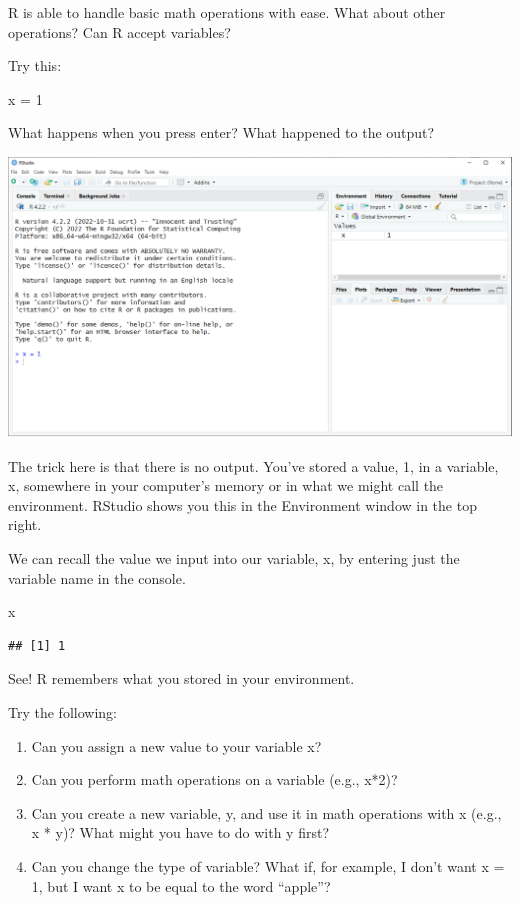 \documentclass[
]{book}
\newenvironment{Shaded}{\begin{snugshade}}{\end{snugshade}}
\newcommand{\DecValTok}[1]{\textcolor[rgb]{0.00,0.00,0.81}{#1}}
\newcommand{\NormalTok}[1]{#1}
\newcommand{\OtherTok}[1]{\textcolor[rgb]{0.56,0.35,0.01}{#1}}
\begin{document}
R is able to handle basic math operations with ease. What about other operations? Can R accept variables?

Try this:

\begin{Shaded}
\begin{Highlighting}[]
\NormalTok{x }\OtherTok{=} \DecValTok{1}
\end{Highlighting}
\end{Shaded}

What happens when you press enter? What happened to the output?

\includegraphics{docs/_main_files/figure-html/RStudio console_x1.png}

The trick here is that there is no output. You've stored a value, 1, in a variable, x, somewhere in your computer's memory or in what we might call the environment. RStudio shows you this in the Environment window in the top right.

We can recall the value we input into our variable, x, by entering just the variable name in the console.

\begin{Shaded}
\begin{Highlighting}[]
\NormalTok{x}
\end{Highlighting}
\end{Shaded}

\begin{verbatim}
## [1] 1
\end{verbatim}

See! R remembers what you stored in your environment.

Try the following:

\begin{enumerate}
\def\labelenumi{\arabic{enumi}.}
\item
  Can you assign a new value to your variable x?
\item
  Can you perform math operations on a variable (e.g., x*2)?
\item
  Can you create a new variable, y, and use it in math operations with x (e.g., x * y)? What might you have to do with y first?
\item
  Can you change the type of variable? What if, for example, I don't want x = 1, but I want x to be equal to the word ``apple''?
\end{enumerate}
\end{document}
